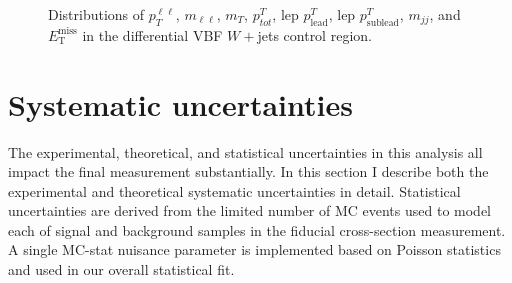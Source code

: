 \begin{figure}[!h]
{  }\hfill
  \hfill
  \hfill
{\caption{Distributions of $p_T^{\ell\ell}$, $m_{\ell\ell}$, $m_T$, $p^T_{tot}$, lep $p^T_{\text{lead}}$, lep $p^T_{\text{sublead}}$, $m_{jj}$, and $\ensuremath{E_{\text{T}}^{\text{miss}}}$ in the differential VBF $W+$jets control region.
\label{fig:WCR}}}
\end{figure}  

\section{Systematic uncertainties}
The experimental, theoretical, and statistical uncertainties in this analysis all impact the final measurement substantially. In this section I describe both the experimental and theoretical systematic uncertainties in detail. Statistical uncertainties are derived from the limited number of MC events used to model each of signal and background samples in the fiducial cross-section measurement. A single MC-stat nuisance parameter is implemented based on Poisson statistics and used in our overall statistical fit. 

